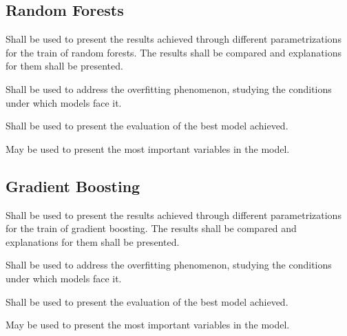 \documentclass[11pt]{article}
\begin{document}

\subsection{Random Forests}
\begin{tcolorbox} %
Shall be used to present the results achieved through different parametrizations for the train of random forests. The results shall be compared and explanations for them shall be presented.
\end{tcolorbox} %
\begin{tcolorbox} %
Shall be used to address the overfitting phenomenon, studying the conditions under which models face it.
\end{tcolorbox} %
\begin{tcolorbox} %
Shall be used to present the evaluation of the best model achieved.
\end{tcolorbox} %
\begin{tcolorbox} %
May be used to present the most important variables in the model.
\end{tcolorbox} %


\subsection{Gradient Boosting}
\begin{tcolorbox} %
Shall be used to present the results achieved through different parametrizations for the train of gradient boosting. The results shall be compared and explanations for them shall be presented.
\end{tcolorbox} %
\begin{tcolorbox} %
Shall be used to address the overfitting phenomenon, studying the conditions under which models face it.
\end{tcolorbox} %
\begin{tcolorbox} %
Shall be used to present the evaluation of the best model achieved.
\end{tcolorbox} %
\begin{tcolorbox} %
May be used to present the most important variables in the model.
\end{tcolorbox} %
\end{document}
